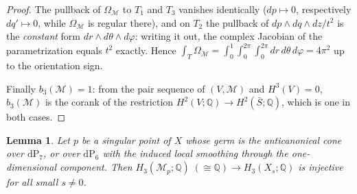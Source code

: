\documentclass[11pt]{amsart}
\newtheorem{lemma}[theorem]{Lemma}
\theoremstyle{definition}
\theoremstyle{remark}
\theoremstyle{plain}
\newcommand{\QQ}{\mathbb{Q}}
\newcommand{\Mil}{\mathcal{M}}  %
\newcommand{\dP}{\mathrm{dP}}
\newcommand{\Sb}{\bar{S}}
\begin{document}
\begin{proof}
The pullback of $\Omega_\Mil$ to $T_1$ and $T_3$ vanishes identically
($dp\mapsto0$, respectively $dq'\mapsto0$, while $\Omega_\Mil$ is
regular there), and on $T_2$ the pullback of
$dp\wedge dq\wedge dz/t^2$ is the \emph{constant} form
$dr\wedge d\theta\wedge d\varphi$: writing it out, the complex
Jacobian of the parametrization equals $t^2$ exactly.
Hence $\int_T\Omega_\Mil=\int_0^1\!\int_0^{2\pi}\!\int_0^{2\pi}
dr\,d\theta\,d\varphi=4\pi^2$ up to the orientation sign.

Finally $b_3(\Mil)=1$: from the pair sequence of $(V,\Mil)$ and
$H^3(V)=0$, $b_3(\Mil)$ is the corank of the restriction
$H^2(V;\QQ)\to H^2(\Sb;\QQ)$, which is one in both cases.
\end{proof}

\begin{lemma}\label{lem:D}
Let $p$ be a singular point of $X$ whose germ is the anticanonical
cone over $\dP_7$, or over $\dP_6$ with the induced local smoothing
through the one-dimensional component.  Then
$H_3(\Mil_p;\QQ)\;(\cong\QQ)\to H_3(X_s;\QQ)$ is injective for all small
$s\neq0$.
\end{lemma}
\end{document}
